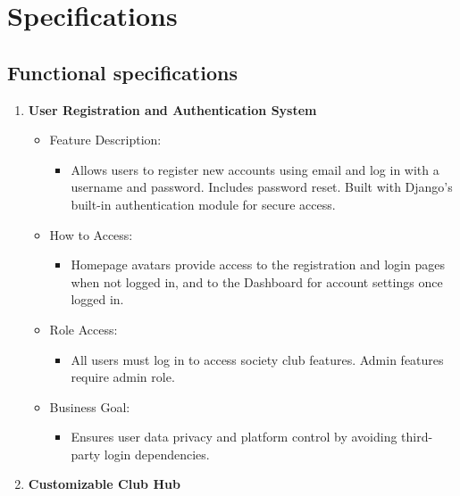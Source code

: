 \chapter{Specifications}
\label{chap:specifications}


\section{Functional specifications}
\label{sect:functional-specifications}
\begin{enumerate}
    \def\labelenumi{\arabic{enumi}.}
    \item
      \textbf{User Registration and Authentication System}
    
      \begin{itemize}
      \item
        Feature Description:
    
        \begin{itemize}
        \item
          Allows users to register new accounts using email and log in with
          a username and password. Includes password reset. Built with
          Django's built-in authentication module for secure access.
        \end{itemize}
      \item
        How to Access:
    
        \begin{itemize}
        \item
          Homepage avatars provide access to the registration and login
          pages when not logged in, and to the Dashboard for account
          settings once logged in.
        \end{itemize}
      \item
        Role Access:
    
        \begin{itemize}
        \item
          All users must log in to access society club features. Admin
          features require admin role.
        \end{itemize}
      \item
        Business Goal:
    
        \begin{itemize}
        \item
          Ensures user data privacy and platform control by avoiding
          third-party login dependencies.
        \end{itemize}
      \end{itemize}
    \item
      \textbf{Customizable Club Hub}
    

\end{enumerate}
